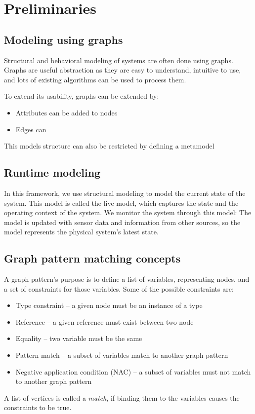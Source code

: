 
\chapter{Preliminaries}



\section{Modeling using graphs}

Structural and behavioral modeling of systems are often done using graphs. Graphs are useful abstraction as they are easy to understand, intuitive to use, and lots of existing algorithms can be used to process them. 

To extend its usability, graphs can be extended by:
\begin{itemize}
	\item Attributes can be added to nodes
	\item Edges can 
\end{itemize}

This models structure can also be restricted by defining a metamodel

\section{Runtime modeling}

In this framework, we use structural modeling to model the current state of the system. This model is called the live model, which captures the state and the operating context of the system. We monitor the system through this model: The model is updated with sensor data and information from other sources, so the model represents the physical system's latest state. 

\section{Graph pattern matching concepts}

A graph pattern's purpose is to define a list of variables, representing nodes, and a set of constraints for those variables. Some of the possible constraints are:

\begin{itemize}
	\item Type constraint -- a given node must be an instance of a type
	\item Reference -- a given reference must exist between two node
	\item Equality -- two variable must be the same
	\item Pattern match -- a subset of variables match to another graph pattern
	\item Negative application condition (NAC) -- a subset of variables must not match to another graph pattern
\end{itemize}
A list of vertices is called a \emph{match}, if binding them to the variables causes the constraints to be true.


